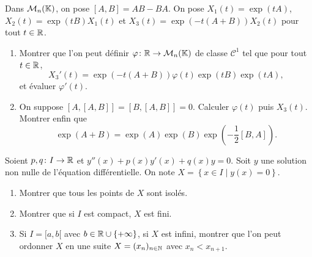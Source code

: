 \documentclass[12pt]{article}
\begin{document}
\begin{exercise}
	Dans $\mathcal{M}_n(\mathbb{K})$, on pose $[A,B]=AB-BA$. On pose $X_1(t)=\exp(tA)$, $X_2(t)=\exp(tB)X_1(t)$ et $X_3(t)=\exp(-t(A+B))X_2(t)$ pour tout $t\in\mathbb{R}$.
	\begin{enumerate}
		\item Montrer que l'on peut définir $\varphi\colon\mathbb{R}\to\mathcal{M}_n(\mathbb{K})$ de classe $\mathcal{C}^{1}$ tel que pour tout $t\in\mathbb{R}$, 
		\begin{equation*}
			X_3'(t)=\exp(-t(A+B))\varphi(t)\exp(tB)\exp(tA),
		\end{equation*}
		et évaluer $\varphi'(t)$.

		\item On suppose $[A,[A,B]]=[B,[A,B]]=0$. Calculer $\varphi(t)$ puis $X_3(t)$. Montrer enfin que 
		\begin{equation*}
			\exp(A+B)=\exp(A)\exp(B)\exp\left(-\frac{1}{2}[B,A]\right).
		\end{equation*}
	\end{enumerate}
\end{exercise}

\begin{exercise}
	Soient $p,q\colon I\to\mathbb{R}$ et $y''(x)+p(x)y'(x)+q(x)y=0$. Soit $y$ une solution non nulle de l'équation différentielle. On note $X=\left\lbrace x\in I\middle| y(x)=0\right\rbrace$.
	\begin{enumerate}
		\item Montrer que tous les points de $X$ sont isolés.
		\item Montrer que si $I$ est compact, $X$ est fini.
		\item Si $I=[a,b[$ avec $b\in\mathbb{R}\cup\left\lbrace+\infty\right\rbrace$, si $X$ est infini, montrer que l'on peut ordonner $X$ en une suite $X=(x_n)_{n\in\mathbb{N}}$ avec $x_n<x_{n+1}$.
	\end{enumerate}
\end{exercise}
\end{document}
